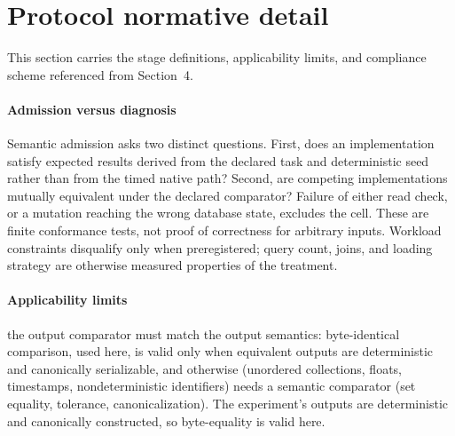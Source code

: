 \documentclass[11pt,a4paper]{article}
\newcommand{\tabledir}{tables/}
\begin{document}


\section{Protocol normative detail}
\label{sup:protocol-normative}
This section carries the stage definitions, applicability limits, and compliance scheme
referenced from Section~4.

\paragraph{Admission versus diagnosis} Semantic admission asks two distinct questions. First, does an implementation satisfy expected results derived from the declared task and deterministic seed rather than from the timed native path? Second, are competing implementations mutually equivalent under the declared comparator? Failure of either read check, or a mutation reaching the wrong database state, excludes the cell. These are finite conformance tests, not proof of correctness for arbitrary inputs. Workload constraints disqualify only when preregistered; query count, joins, and loading strategy are otherwise measured properties of the treatment.

\paragraph{Applicability limits} the output comparator must match the output semantics: byte-identical comparison,
used here, is valid only when equivalent outputs are deterministic and canonically serializable, and
otherwise (unordered collections, floats, timestamps, nondeterministic identifiers) needs a semantic
comparator (set equality, tolerance, canonicalization). The experiment's outputs are deterministic and
canonically constructed, so byte-equality is valid here.
\end{document}
